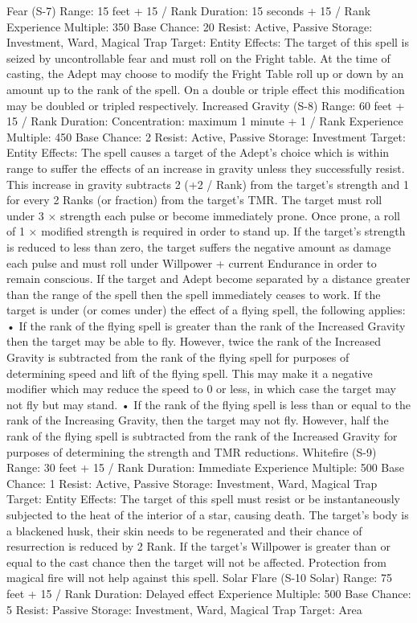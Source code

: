 \documentclass[a4paper]{article}
\begin{document}
\begin{multicols}{3}
Fear (S-7)
Range: 15 feet + 15 / Rank
Duration: 15 seconds + 15 / Rank
Experience Multiple: 350
Base Chance: 20%
Resist: Active, Passive
Storage: Investment, Ward, Magical Trap
Target: Entity
Effects: The target of this spell is seized by uncontrollable fear and must roll on the Fright table. At
the time of casting, the Adept may choose to modify the Fright Table roll up or down by an amount
up to the rank of the spell. On a double or triple
effect this modification may be doubled or tripled
respectively.
Increased Gravity (S-8)
Range: 60 feet + 15 / Rank
Duration: Concentration: maximum 1 minute + 1 /
Rank
Experience Multiple: 450
Base Chance: 2%
Resist: Active, Passive
Storage: Investment
Target: Entity
Effects: The spell causes a target of the Adept’s
choice which is within range to suffer the effects of
an increase in gravity unless they successfully
resist. This increase in gravity subtracts 2 (+2 /
Rank) from the target’s strength and 1 for every 2
Ranks (or fraction) from the target’s TMR. The
target must roll under 3 × strength each pulse or
become immediately prone. Once prone, a roll of 1
× modified strength is required in order to stand
up. If the target’s strength is reduced to less than
zero, the target suffers the negative amount as
damage each pulse and must roll under Willpower
+ current Endurance in order to remain conscious.
If the target and Adept become separated by a
distance greater than the range of the spell then the
spell immediately ceases to work. If the target is
under (or comes under) the effect of a flying spell,
the following applies:
• If the rank of the flying spell is greater than the
rank of the Increased Gravity then the target may
be able to fly. However, twice the rank of the Increased Gravity is subtracted from the rank of the
flying spell for purposes of determining speed and
lift of the flying spell. This may make it a negative
modifier which may reduce the speed to 0 or less,
in which case the target may not fly but may stand.
• If the rank of the flying spell is less than or equal
to the rank of the Increasing Gravity, then the
target may not fly. However, half the rank of the
flying spell is subtracted from the rank of the Increased Gravity for purposes of determining the
strength and TMR reductions.
Whitefire (S-9)
Range: 30 feet + 15 / Rank
Duration: Immediate
Experience Multiple: 500
Base Chance: 1%
Resist: Active, Passive
Storage: Investment, Ward, Magical Trap
Target: Entity
Effects: The target of this spell must resist or be
instantaneously subjected to the heat of the interior
of a star, causing death. The target’s body is a
blackened husk, their skin needs to be regenerated
and their chance of resurrection is reduced by 2%
Rank. If the target’s Willpower is greater than or
equal to the cast chance then the target will not be
affected. Protection from magical fire will not help
against this spell.
Solar Flare (S-10 Solar)
Range: 75 feet + 15 / Rank
Duration: Delayed effect
Experience Multiple: 500
Base Chance: 5%
Resist: Passive
Storage: Investment, Ward, Magical Trap
Target: Area


\end{multicols}
\end{document}
